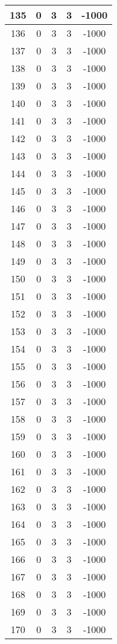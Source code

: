 \documentclass[letterpaper, 12pt]{article}
\begin{document}
\begin{longtable}{|c|c|c|c|c|}
\hline
135 & 0 & 3 & 3 & -1000 \\
\hline
136 & 0 & 3 & 3 & -1000 \\
\hline
137 & 0 & 3 & 3 & -1000 \\
\hline
138 & 0 & 3 & 3 & -1000 \\
\hline
139 & 0 & 3 & 3 & -1000 \\
\hline
140 & 0 & 3 & 3 & -1000 \\
\hline
141 & 0 & 3 & 3 & -1000 \\
\hline
142 & 0 & 3 & 3 & -1000 \\
\hline
143 & 0 & 3 & 3 & -1000 \\
\hline
144 & 0 & 3 & 3 & -1000 \\
\hline
145 & 0 & 3 & 3 & -1000 \\
\hline
146 & 0 & 3 & 3 & -1000 \\
\hline
147 & 0 & 3 & 3 & -1000 \\
\hline
148 & 0 & 3 & 3 & -1000 \\
\hline
149 & 0 & 3 & 3 & -1000 \\
\hline
150 & 0 & 3 & 3 & -1000 \\
\hline
151 & 0 & 3 & 3 & -1000 \\
\hline
152 & 0 & 3 & 3 & -1000 \\
\hline
153 & 0 & 3 & 3 & -1000 \\
\hline
154 & 0 & 3 & 3 & -1000 \\
\hline
155 & 0 & 3 & 3 & -1000 \\
\hline
156 & 0 & 3 & 3 & -1000 \\
\hline
157 & 0 & 3 & 3 & -1000 \\
\hline
158 & 0 & 3 & 3 & -1000 \\
\hline
159 & 0 & 3 & 3 & -1000 \\
\hline
160 & 0 & 3 & 3 & -1000 \\
\hline
161 & 0 & 3 & 3 & -1000 \\
\hline
162 & 0 & 3 & 3 & -1000 \\
\hline
163 & 0 & 3 & 3 & -1000 \\
\hline
164 & 0 & 3 & 3 & -1000 \\
\hline
165 & 0 & 3 & 3 & -1000 \\
\hline
166 & 0 & 3 & 3 & -1000 \\
\hline
167 & 0 & 3 & 3 & -1000 \\
\hline
168 & 0 & 3 & 3 & -1000 \\
\hline
169 & 0 & 3 & 3 & -1000 \\
\hline
170 & 0 & 3 & 3 & -1000 \\

\end{longtable}
\end{document}
